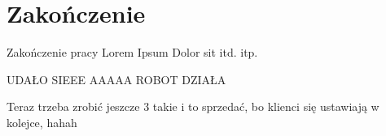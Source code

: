 
\chapter{Zakończenie}\label{ch:zakonczenie}

Zakończenie pracy
Lorem Ipsum Dolor sit itd. itp.

UDAŁO SIEEE
AAAAA
ROBOT DZIAŁA

Teraz trzeba zrobić jeszcze 3  takie i to sprzedać, bo klienci się ustawiają w kolejce, hahah